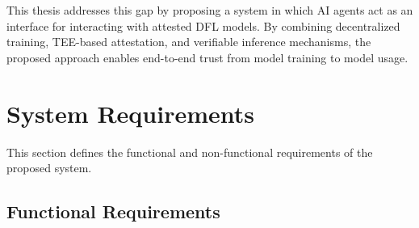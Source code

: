This thesis addresses this gap by proposing a system in which \ac{AI} agents act as an interface for interacting with attested \ac{DFL} models. By combining decentralized training, \ac{TEE}-based attestation, and verifiable inference mechanisms, the proposed approach enables end-to-end trust from model training to model usage.



\newpage

\section{System Requirements}
\label{sec:requirements}

This section defines the functional and non-functional requirements of the proposed system.


\renewcommand{\thefuncReq}{F\arabic{funcReq}}
\renewcommand{\thenonFuncReq}{NF\arabic{nonFuncReq}}

\subsection{Functional Requirements}

